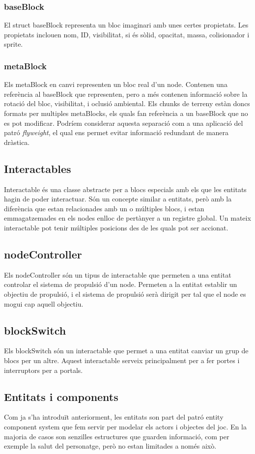 \subsubsection{baseBlock}
El struct baseBlock representa un bloc imaginari amb unes certes propietats. Les propietats inclouen nom, ID, visibilitat, si és sòlid, opacitat, massa, colisionador i sprite.

\subsubsection{metaBlock}
Els metaBlock en canvi representen un bloc real d'un node. Contenen una referència al baseBlock que representen, pero a més contenen informació sobre la rotació del bloc, visibilitat, i oclusió ambiental.
Els chunks de terreny estàn doncs formats per multiples metaBlocks, els quals fan referència a un baseBlock que no es pot modificar. Podríem considerar aquesta separació com a una aplicació del patró \textit{flyweight}, el qual ens permet evitar informació redundant de manera dràstica.
\subsection{Interactables}
Interactable és una classe abstracte per a blocs especials amb els que les entitats hagin de poder interactuar. Són un concepte similar a entitats, però amb la diferència que estan relacionades amb un o múltiples blocs, i estan emmagatzemades en els nodes enlloc de pertànyer a un registre global.
Un mateix interactable pot tenir múltiples posicions des de les quals pot ser accionat.
\subsection{nodeController}
Els nodeController són un tipus de interactable que permeten a una entitat controlar el sistema de propulsió d'un node. Permeten a la entitat establir un objectiu de propulsió, i el sistema de propulsió serà dirigit per tal que el node es mogui cap aquell objectiu.
\subsection{blockSwitch}
Els blockSwitch són un interactable que permet a una entitat canviar un grup de blocs per un altre. Aquest interactable serveix principalment per a fer portes i interruptors per a portals.
\subsection{Entitats i components}
Com ja s'ha introduït anteriorment, les entitats son part del patró entity component system que fem servir per modelar els actors i objectes del joc. En la majoria de casos son senzilles estructures que guarden informació, com per exemple la salut del personatge, però no estan limitades a només això.
